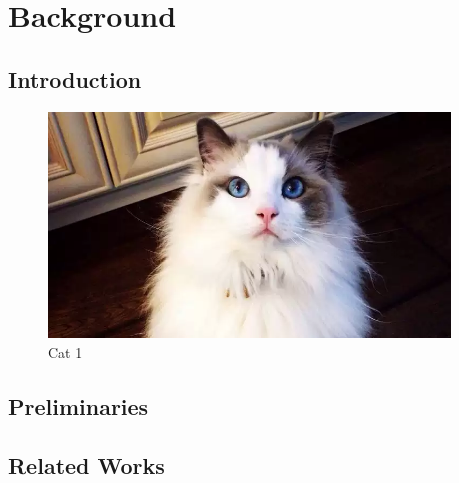 \chapter{Background}
\newpage 

 
\section{Introduction}
\begin{figure}[h]
	\centering
	\includegraphics[width=0.95\textwidth]{background/images/fig1}
	\caption{Cat 1}
\end{figure}

\section{Preliminaries}


\section{Related Works}


